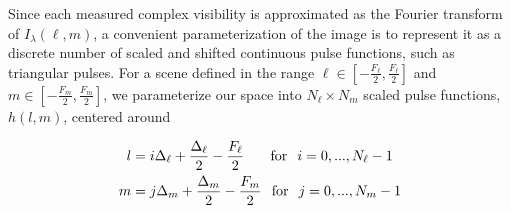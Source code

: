 Since each measured complex visibility is approximated as the Fourier transform of $I_{\lambda}(\ell,m)$, a convenient parameterization of the image is to represent it as a discrete number of scaled and shifted continuous pulse functions, such as triangular pulses.
For a scene defined in the range $\ell \in [-\frac{F_\ell}{2}, \frac{F_\ell}{2}]$ and $m \in [-\frac{F_m}{2}, \frac{F_m}{2}]$,
we parameterize our space into $N_\ell \times N_m$ scaled pulse functions, $h(l,m)$, centered around 


\begin{align}
 l &= i \Delta_{\ell} + \frac{\Delta_{\ell}}{2}  -\frac{F_\ell}{2} \hspace{0.26in} \mbox{for} \hspace{0.1 in} i = 0,...,N_\ell-1
 \label{eq:discrete1}
\\m &= j\Delta_m + \frac{\Delta_m}{2} -\frac{F_m}{2} \hspace{0.1in} \mbox{for} \hspace{0.1 in} j= 0,...,N_m-1
\label{eq:discrete2}
\end{align} 


